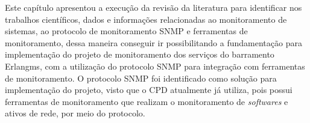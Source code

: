 Este capítulo apresentou a execução da revisão da literatura para identificar nos trabalhos científicos, dados e informações relacionadas ao monitoramento de sistemas, ao protocolo de monitoramento \acrshort{SNMP} e ferramentas de monitoramento, dessa maneira conseguir ir possibilitando a fundamentação para implementação do projeto de monitoramento dos serviços do barramento Erlangms, com a utilização do protocolo \acrshort{SNMP} para integração com ferramentas de monitoramento. O protocolo \acrshort{SNMP} foi identificado como solução para implementação do projeto, visto que o \acrshort{CPD} atualmente já utiliza, pois possui ferramentas de monitoramento que realizam o monitoramento de \textit{softwares} e ativos de rede, por meio do protocolo. 

